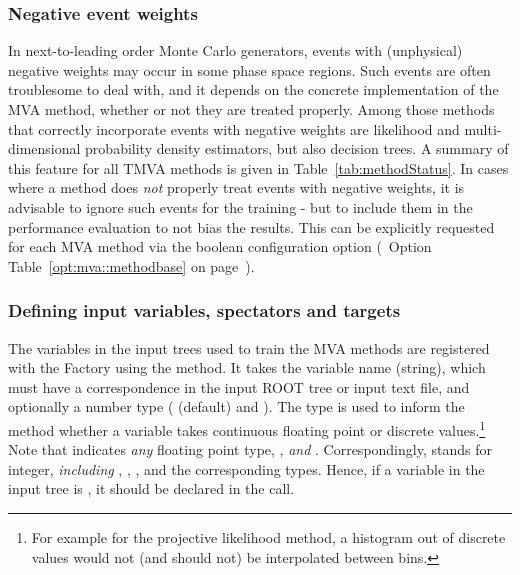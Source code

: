 \subsubsection{Negative event weights}
\label{sec:NegativeEventWeights}

In next-to-leading order Monte Carlo generators, events with
(unphysical) negative weights may occur in some phase space
regions. Such events are often troublesome to deal with, and it
depends on the concrete implementation of the MVA method, whether or
not they are treated properly. Among those methods that correctly
incorporate events with negative weights are likelihood 
and multi-dimensional probability density estimators, but also 
decision trees. A summary of this feature for all TMVA methods is given in
Table~\ref{tab:methodStatus}. In cases where a method does {\em not}
properly treat events with negative weights, it is advisable to ignore
such events for the training - but to include them in the performance
evaluation to not bias the results. This can be explicitly requested for 
each MVA method via the boolean configuration option  
(\cf\  Option Table~\ref{opt:mva::methodbase} on
page~\pageref{opt:mva::methodbase}). 


\subsubsection{Defining input variables, spectators and targets}
\label{sec:defineVariables}

The variables in the input trees used to train the MVA methods are registered 
with the Factory using the  method. It takes the variable name 
(string), which must have a correspondence in the input ROOT tree or input text file,
and optionally a number type ( (default) and ). The type is used 
to inform the method whether a variable takes continuous floating point or discrete 
values.\footnote
{
  For example for the projective likelihood method, a histogram out of discrete 
  values would not (and should not) be interpolated between bins. 
}
Note that  indicates {\em any} floating point type, \ie,  
{\em and} . Correspondingly,  stands for integer, 
{\em including} , , , and the corresponding 
 types. Hence, if a variable in the input tree is , 
it should be declared  in the   call. 

